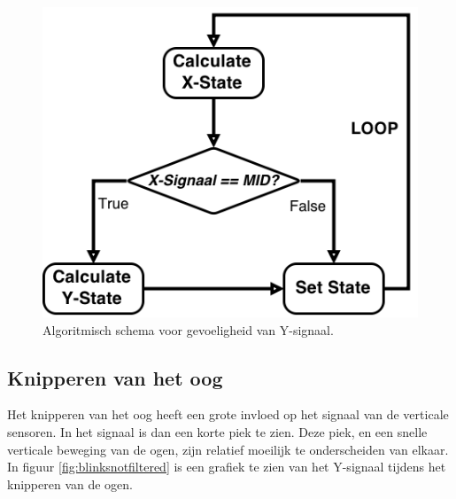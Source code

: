 \documentclass{article}
\begin{document}
\begin{figure}[H]
	\centering
	\includegraphics[width=0.7\linewidth]{images/GevoeligheidY}
	\caption{Algoritmisch schema voor gevoeligheid van Y-signaal.}
	\label{fig:algogevoeligheidY}
\end{figure}

\subsection{Knipperen van het oog}

Het knipperen van het oog heeft een grote invloed op het signaal van de verticale sensoren. In het signaal is dan een korte piek te zien. Deze piek, en een snelle verticale beweging van de ogen, zijn relatief moeilijk te onderscheiden van elkaar. In figuur \ref{fig:blinksnotfiltered} is een grafiek te zien van het Y-signaal tijdens het knipperen van de ogen.
\end{document}
